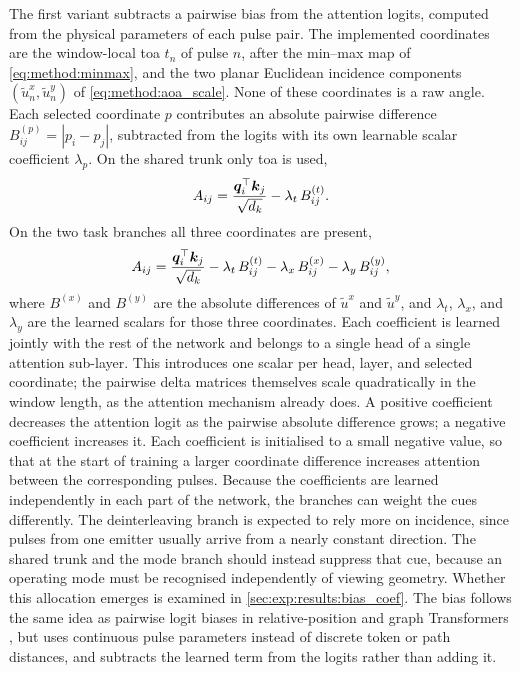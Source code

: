 The first variant subtracts a pairwise bias from the attention logits, computed from the physical parameters of each pulse pair.
The implemented coordinates are the window-local \gls{toa} $t_n$ of pulse $n$, after the min--max map of \cref{eq:method:minmax}, and the two planar Euclidean incidence components $(\tilde{u}^{x}_n,\tilde{u}^{y}_n)$ of \cref{eq:method:aoa_scale}.
None of these coordinates is a raw angle.
Each selected coordinate $p$ contributes an absolute pairwise difference $B^{(p)}_{ij} = |p_i - p_j|$, subtracted from the logits with its own learnable scalar coefficient $\lambda_p$.
On the shared trunk only \gls{toa} is used,
\begin{equation}\label{eq:method:attn_bias_trunk}
  A_{ij}
  =
  \frac{\bm{q}_i^{\top}\bm{k}_j}{\sqrt{d_k}}
  - \lambda_t\, B^{(t)}_{ij}.
\end{equation}
On the two task branches all three coordinates are present,
\begin{equation}\label{eq:method:attn_bias}
  A_{ij}
  =
  \frac{\bm{q}_i^{\top}\bm{k}_j}{\sqrt{d_k}}
  - \lambda_t\, B^{(t)}_{ij}
  - \lambda_{x}\, B^{(x)}_{ij}
  - \lambda_{y}\, B^{(y)}_{ij},
\end{equation}
where $B^{(x)}$ and $B^{(y)}$ are the absolute differences of $\tilde{u}^{x}$ and $\tilde{u}^{y}$, and $\lambda_t$, $\lambda_x$, and $\lambda_y$ are the learned scalars for those three coordinates.
Each coefficient is learned jointly with the rest of the network and belongs to a single head of a single attention sub-layer.
This introduces one scalar per head, layer, and selected coordinate; the pairwise delta matrices themselves scale quadratically in the window length, as the attention mechanism already does.
A positive coefficient decreases the attention logit as the pairwise absolute difference grows; a negative coefficient increases it.
Each coefficient is initialised to a small negative value, so that at the start of training a larger coordinate difference increases attention between the corresponding pulses.
Because the coefficients are learned independently in each part of the network, the branches can weight the cues differently.
The deinterleaving branch is expected to rely more on incidence, since pulses from one emitter usually arrive from a nearly constant direction.
The shared trunk and the mode branch should instead suppress that cue, because an operating mode must be recognised independently of viewing geometry.
Whether this allocation emerges is examined in \cref{sec:exp:results:bias_coef}.
The bias follows the same idea as pairwise logit biases in relative-position and graph Transformers \parencite{shaw2018relative,ying2021graphormer}, but uses continuous pulse parameters instead of discrete token or path distances, and subtracts the learned term from the logits rather than adding it.

